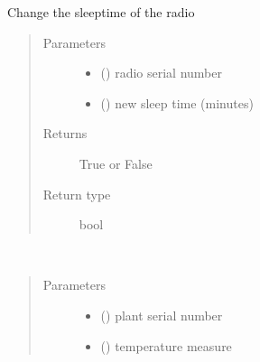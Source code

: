 \documentclass[letterpaper,10pt,english]{sphinxmanual}
\begin{document}

\begin{fulllineitems}
\label{\detokenize{index:controller.utility.update_sleep_time}}
Change the sleep\sphinxhyphen{}time of the radio
\begin{quote}\begin{description}
\item[{Parameters}] \leavevmode\begin{itemize}
\item {} 
 () \textendash{} radio serial number

\item {} 
 () \textendash{} new sleep time (minutes)

\end{itemize}

\item[{Returns}] \leavevmode
True or False

\item[{Return type}] \leavevmode
bool

\end{description}\end{quote}

\end{fulllineitems}


\begin{fulllineitems}
\label{\detokenize{index:controller.utility.update_temp}}~\begin{quote}\begin{description}
\item[{Parameters}] \leavevmode\begin{itemize}
\item {} 
 () \textendash{} plant serial number

\item {} 
 () \textendash{} temperature measure

\end{itemize}

\end{description}\end{quote}

\end{fulllineitems}
\end{document}
